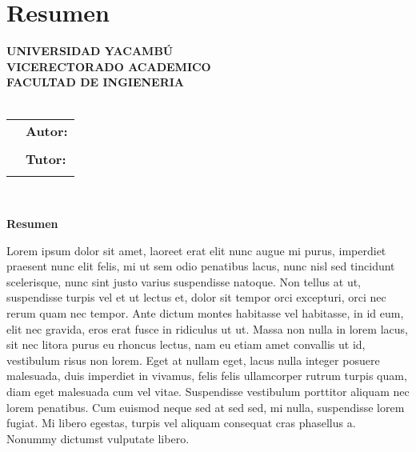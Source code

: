 \part*{Resumen}

\begin{center}
\large{\textbf{UNIVERSIDAD YACAMBÚ}} \\
\large{\textbf{VICERECTORADO ACADEMICO}}\\
\large{\textbf{FACULTAD DE INGIENERIA}}\\
\vspace{1cm}
\Large{\textbf{\Titulo}}\\
\end{center}
\vspace{1cm}
\begin{tabular}{l l}
    \hspace{65mm}	&	\textbf{Autor:}	\\
			&	\Autor		\\
			&	\textbf{Tutor:}	\\
			&	\Tutor		\\
\end{tabular}
\\
\begin{center}
\Large{\textbf{Resumen}}\\
\end{center}
Lorem ipsum dolor sit amet, laoreet erat elit nunc augue mi purus, imperdiet praesent nunc elit felis, mi ut sem odio penatibus lacus, nunc nisl sed tincidunt scelerisque, nunc sint justo varius suspendisse natoque. Non tellus at ut, suspendisse turpis vel et ut lectus et, dolor sit tempor orci excepturi, orci nec rerum quam nec tempor. Ante dictum montes habitasse vel habitasse, in id eum, elit nec gravida, eros erat fusce in ridiculus ut ut. Massa non nulla in lorem lacus, sit nec litora purus eu rhoncus lectus, nam eu etiam amet convallis ut id, vestibulum risus non lorem. Eget at nullam eget, lacus nulla integer posuere malesuada, duis imperdiet in vivamus, felis felis ullamcorper rutrum turpis quam, diam eget malesuada cum vel vitae. Suspendisse vestibulum porttitor aliquam nec lorem penatibus. Cum euismod neque sed at sed sed, mi nulla, suspendisse lorem fugiat. Mi libero egestas, turpis vel aliquam consequat cras phasellus a. Nonummy dictumst vulputate libero. \\
